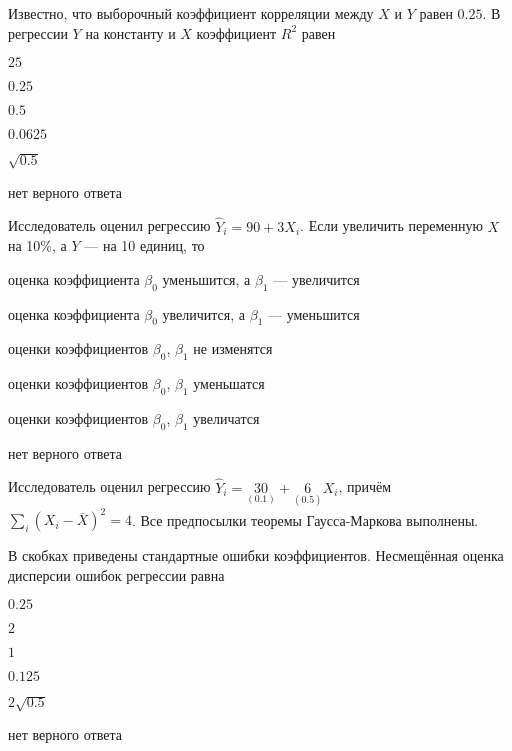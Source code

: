 \begin{question}
Известно, что выборочный коэффициент корреляции между $X$ и $Y$ равен $0.25$. 
В регрессии $Y$ на константу и $X$ коэффициент $R^2$ равен
\begin{answerlist}
  \item $25$
  \item $0.25$
  \item $0.5$
  \item $0.0625$
  \item $\sqrt{0.5}$
  \item нет верного ответа
\end{answerlist}
\end{question}



\begin{question}
Исследователь оценил регрессию $\hat Y_i = 90 + 3 X_i$. Если увеличить переменную $X$ на 10\%,
а $Y$ — на 10 единиц, то 

\begin{answerlist}[2]
  \item оценка коэффициента $\beta_0$ уменьшится, а $\beta_1$ — увеличится
  \item оценка коэффициента $\beta_0$ увеличится, а $\beta_1$ — уменьшится
  \item оценки коэффициентов $\beta_0$, $\beta_1$ не изменятся
  \item оценки коэффициентов $\beta_0$, $\beta_1$ уменьшатся
  \item оценки коэффициентов $\beta_0$, $\beta_1$ увеличатся
  \item нет верного ответа
\end{answerlist}
\end{question}

\begin{question}
Исследователь оценил регрессию $\hat Y_i = \underset{(0.1)}{30} + \underset{(0.5)}{6} X_i$, причём $\sum_i (X_i - \bar X)^2=4$. Все предпосылки теоремы Гаусса-Маркова выполнены. 

В скобках приведены стандартные ошибки коэффициентов. 
Несмещённая оценка дисперсии ошибок регрессии равна 
\begin{answerlist}
  \item $0.25$
  \item $2$
  \item $1$
  \item $0.125$
  \item $2\sqrt{0.5}$
  \item нет верного ответа
\end{answerlist}
\end{question}


